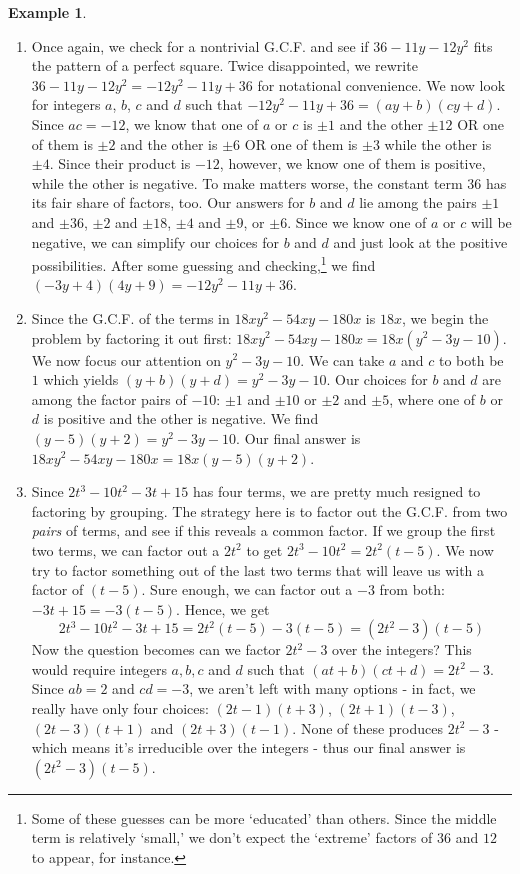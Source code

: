 \documentclass[11pt]{article}
\theoremstyle{definition}  %
\newtheorem{ex}{\bf Example}
\begin{document}
\begin{ex}
\begin{enumerate}
\item  Once again, we check for a nontrivial G.C.F. and see if $36 - 11y - 12y^2$ fits the pattern of a perfect square.  Twice disappointed, we rewrite $36 - 11y - 12y^2 = -12y^2 - 11y + 36$ for notational convenience.  We now look for integers $a$, $b$, $c$ and $d$ such that $-12y^2 - 11y + 36 = (ay + b)(cy + d)$.  Since $ac =-12$, we know that one of $a$ or $c$ is $\pm 1$ and the other $\pm 12$ OR one of them is $\pm 2$ and the other is $\pm 6$ OR one of them is $\pm 3$ while the other is $\pm 4$. Since their product is $-12$, however, we know one of them is positive, while the other is negative.   To make matters worse, the constant term $36$ has its fair share of factors, too.  Our answers for $b$ and $d$ lie among the pairs $\pm 1$ and $\pm 36$, $\pm 2$ and $\pm 18$, $\pm 4$ and $\pm 9$, or $\pm 6$.  Since we know one of $a$ or $c$ will be negative, we can simplify our choices for $b$ and $d$ and just look at the positive possibilities.  After some guessing and checking,\footnote{Some of these guesses can be more `educated' than others.  Since the middle term is relatively `small,' we don't expect the `extreme' factors of $36$ and $12$ to appear, for instance.} we find $(-3y + 4)(4y+9) = -12y^2 - 11y + 36$.

\item  Since the G.C.F. of the terms in $18xy^2 - 54xy - 180x$  is $18x$, we begin the problem by factoring it out first:  $18xy^2 - 54xy - 180x = 18x(y^2 - 3y - 10)$.  We now focus our attention on $y^2 - 3y - 10$.  We can take $a$ and $c$ to both be $1$ which yields $(y+b)(y+d) = y^2 - 3y - 10$.  Our choices for $b$ and $d$ are among the factor pairs of $-10$: $\pm 1$ and $\pm 10$ or $\pm 2$ and $\pm 5$, where one of $b$ or $d$ is positive and the other is negative.  We find $(y-5)(y+2) = y^2 - 3y - 10$.  Our final answer is $18xy^2 - 54xy - 180x = 18x(y-5)(y+2)$.

\item Since $2t^3 - 10t^2 - 3t + 15$  has four terms, we are pretty much resigned to factoring by grouping.  The strategy here is to factor out the G.C.F. from two \textit{pairs} of terms, and see if this reveals a common factor. If we group the first two terms, we can factor out a $2t^2$ to get $2t^3 - 10t^2 = 2t^2(t-5)$.  We now try to factor something out of the last two terms that will leave us with a factor of $(t-5)$.  Sure enough, we can factor out a $-3$ from both:  $-3t + 15 = -3(t-5)$.  Hence, we get \[ 2t^3 - 10t^2 - 3t + 15 = 2t^2(t-5) - 3(t-5) = (2t^2-3)(t-5)\] Now the question becomes can we factor $2t^2 - 3$ over the integers?  This would require integers $a, b, c$ and $d$ such that $(at + b)(ct + d) = 2t^2 - 3$.   Since $ab = 2$ and $cd = -3$, we aren't left with many options - in fact, we really have only four choices:  $(2t - 1)(t+3)$, $(2t+1)(t-3)$, $(2t - 3)(t+1)$ and $(2t+3)(t-1)$.  None of these produces $2t^2 - 3$ - which means it's irreducible over the integers - thus our final answer is $(2t^2-3)(t-5)$.


\end{enumerate}
\end{ex}
\end{document}
